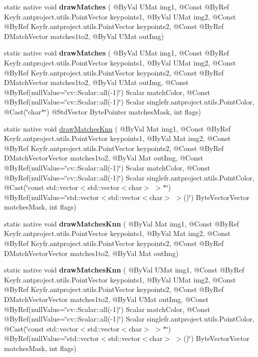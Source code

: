 \begin{DoxyCompactItemize}
static native void {\bfseries draw\+Matches} ( @By\+Val U\+Mat img1, @Const @By\+Ref Key\+fr.antproject.utils.Point\+Vector keypoints1, @By\+Val U\+Mat img2, @Const @By\+Ref Key\+fr.antproject.utils.Point\+Vector keypoints2, @Const @By\+Ref D\+Match\+Vector matches1to2, @By\+Val U\+Mat out\+Img)
\item 
static native void {\bfseries draw\+Matches} ( @By\+Val U\+Mat img1, @Const @By\+Ref Key\+fr.antproject.utils.Point\+Vector keypoints1, @By\+Val U\+Mat img2, @Const @By\+Ref Key\+fr.antproject.utils.Point\+Vector keypoints2, @Const @By\+Ref D\+Match\+Vector matches1to2, @By\+Val U\+Mat out\+Img, @Const @By\+Ref(null\+Value=\char`\"{}cv\+::\+Scalar\+::all(-\/1)\char`\"{}) Scalar match\+Color, @Const @By\+Ref(null\+Value=\char`\"{}cv\+::\+Scalar\+::all(-\/1)\char`\"{}) Scalar single\+fr.antproject.utils.Point\+Color, @Cast(\char`\"{}char$\ast$\char`\"{}) @Std\+Vector Byte\+Pointer matches\+Mask, int flags)
\item 
static native void \hyperlink{group__features2d__draw_ga685267fdd3340d65fba4cf402d6dbe04}{draw\+Matches\+Knn} ( @By\+Val Mat img1, @Const @By\+Ref Key\+fr.antproject.utils.Point\+Vector keypoints1, @By\+Val Mat img2, @Const @By\+Ref Key\+fr.antproject.utils.Point\+Vector keypoints2, @Const @By\+Ref D\+Match\+Vector\+Vector matches1to2, @By\+Val Mat out\+Img, @Const @By\+Ref(null\+Value=\char`\"{}cv\+::\+Scalar\+::all(-\/1)\char`\"{}) Scalar match\+Color, @Const @By\+Ref(null\+Value=\char`\"{}cv\+::\+Scalar\+::all(-\/1)\char`\"{}) Scalar single\+fr.antproject.utils.Point\+Color, @Cast(\char`\"{}const std\+::vector$<$std\+::vector$<$char$>$ $>$$\ast$\char`\"{}) @By\+Ref(null\+Value=\char`\"{}std\+::vector$<$std\+::vector$<$char$>$ $>$()\char`\"{}) Byte\+Vector\+Vector matches\+Mask, int flags)
\item 
static native void {\bfseries draw\+Matches\+Knn} ( @By\+Val Mat img1, @Const @By\+Ref Key\+fr.antproject.utils.Point\+Vector keypoints1, @By\+Val Mat img2, @Const @By\+Ref Key\+fr.antproject.utils.Point\+Vector keypoints2, @Const @By\+Ref D\+Match\+Vector\+Vector matches1to2, @By\+Val Mat out\+Img)
\item 
static native void {\bfseries draw\+Matches\+Knn} ( @By\+Val U\+Mat img1, @Const @By\+Ref Key\+fr.antproject.utils.Point\+Vector keypoints1, @By\+Val U\+Mat img2, @Const @By\+Ref Key\+fr.antproject.utils.Point\+Vector keypoints2, @Const @By\+Ref D\+Match\+Vector\+Vector matches1to2, @By\+Val U\+Mat out\+Img, @Const @By\+Ref(null\+Value=\char`\"{}cv\+::\+Scalar\+::all(-\/1)\char`\"{}) Scalar match\+Color, @Const @By\+Ref(null\+Value=\char`\"{}cv\+::\+Scalar\+::all(-\/1)\char`\"{}) Scalar single\+fr.antproject.utils.Point\+Color, @Cast(\char`\"{}const std\+::vector$<$std\+::vector$<$char$>$ $>$$\ast$\char`\"{}) @By\+Ref(null\+Value=\char`\"{}std\+::vector$<$std\+::vector$<$char$>$ $>$()\char`\"{}) Byte\+Vector\+Vector matches\+Mask, int flags)

\end{DoxyCompactItemize}
